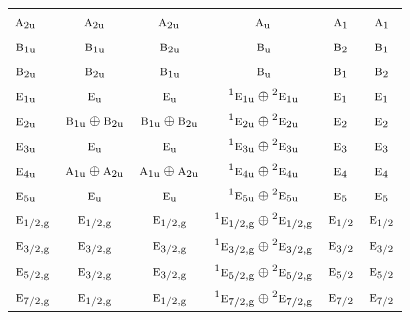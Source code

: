\documentclass[10pt,a4paper]{article}
\numberwithin{equation}{section}
\newcommand{\irr}[1]{\text{\normalfont\scshape #1}}
\newcommand{\conjpair}[1]{{}^{#1}}
\newcommand{\ptag}[1]{\mathrm{#1}}
\begin{document}
{\begin{longtable}{@{}lccccc@{}}
$\irr{a}_{2\ptag{u}}$ & $\irr{a}_{2\ptag{u}}$ & $\irr{a}_{2\ptag{u}}$ & $\irr{a}_{\ptag{u}}$ & $\irr{a}_{1}$ & $\irr{a}_{1}$\\
$\irr{b}_{1\ptag{u}}$ & $\irr{b}_{1\ptag{u}}$ & $\irr{b}_{2\ptag{u}}$ & $\irr{b}_{\ptag{u}}$ & $\irr{b}_{2}$ & $\irr{b}_{1}$\\
$\irr{b}_{2\ptag{u}}$ & $\irr{b}_{2\ptag{u}}$ & $\irr{b}_{1\ptag{u}}$ & $\irr{b}_{\ptag{u}}$ & $\irr{b}_{1}$ & $\irr{b}_{2}$\\
$\irr{e}_{1\ptag{u}}$ & $\irr{e}_{\ptag{u}}$ & $\irr{e}_{\ptag{u}}$ & $\conjpair{1}\irr{e}_{1\ptag{u}}\oplus \conjpair{2}\irr{e}_{1\ptag{u}}$ & $\irr{e}_{1}$ & $\irr{e}_{1}$\\
$\irr{e}_{2\ptag{u}}$ & $\irr{b}_{1\ptag{u}}\oplus \irr{b}_{2\ptag{u}}$ & $\irr{b}_{1\ptag{u}}\oplus \irr{b}_{2\ptag{u}}$ & $\conjpair{1}\irr{e}_{2\ptag{u}}\oplus \conjpair{2}\irr{e}_{2\ptag{u}}$ & $\irr{e}_{2}$ & $\irr{e}_{2}$\\
$\irr{e}_{3\ptag{u}}$ & $\irr{e}_{\ptag{u}}$ & $\irr{e}_{\ptag{u}}$ & $\conjpair{1}\irr{e}_{3\ptag{u}}\oplus \conjpair{2}\irr{e}_{3\ptag{u}}$ & $\irr{e}_{3}$ & $\irr{e}_{3}$\\
$\irr{e}_{4\ptag{u}}$ & $\irr{a}_{1\ptag{u}}\oplus \irr{a}_{2\ptag{u}}$ & $\irr{a}_{1\ptag{u}}\oplus \irr{a}_{2\ptag{u}}$ & $\conjpair{1}\irr{e}_{4\ptag{u}}\oplus \conjpair{2}\irr{e}_{4\ptag{u}}$ & $\irr{e}_{4}$ & $\irr{e}_{4}$\\
$\irr{e}_{5\ptag{u}}$ & $\irr{e}_{\ptag{u}}$ & $\irr{e}_{\ptag{u}}$ & $\conjpair{1}\irr{e}_{5\ptag{u}}\oplus \conjpair{2}\irr{e}_{5\ptag{u}}$ & $\irr{e}_{5}$ & $\irr{e}_{5}$\\
$\irr{e}_{1/2,\ptag{g}}$ & $\irr{e}_{1/2,\ptag{g}}$ & $\irr{e}_{1/2,\ptag{g}}$ & $\conjpair{1}\irr{e}_{1/2,\ptag{g}}\oplus \conjpair{2}\irr{e}_{1/2,\ptag{g}}$ & $\irr{e}_{1/2}$ & $\irr{e}_{1/2}$\\
$\irr{e}_{3/2,\ptag{g}}$ & $\irr{e}_{3/2,\ptag{g}}$ & $\irr{e}_{3/2,\ptag{g}}$ & $\conjpair{1}\irr{e}_{3/2,\ptag{g}}\oplus \conjpair{2}\irr{e}_{3/2,\ptag{g}}$ & $\irr{e}_{3/2}$ & $\irr{e}_{3/2}$\\
$\irr{e}_{5/2,\ptag{g}}$ & $\irr{e}_{3/2,\ptag{g}}$ & $\irr{e}_{3/2,\ptag{g}}$ & $\conjpair{1}\irr{e}_{5/2,\ptag{g}}\oplus \conjpair{2}\irr{e}_{5/2,\ptag{g}}$ & $\irr{e}_{5/2}$ & $\irr{e}_{5/2}$\\
$\irr{e}_{7/2,\ptag{g}}$ & $\irr{e}_{1/2,\ptag{g}}$ & $\irr{e}_{1/2,\ptag{g}}$ & $\conjpair{1}\irr{e}_{7/2,\ptag{g}}\oplus \conjpair{2}\irr{e}_{7/2,\ptag{g}}$ & $\irr{e}_{7/2}$ & $\irr{e}_{7/2}$\\

\end{longtable}}
\end{document}
